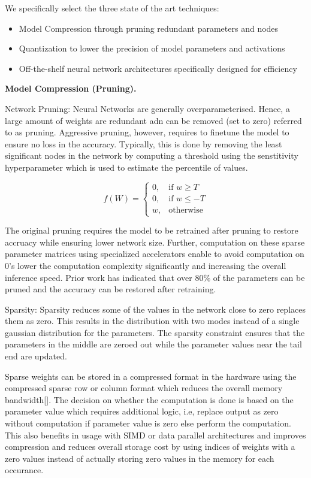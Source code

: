 We specifically select the three state of the art techniques:
\begin{itemize}
\item Model Compression through pruning redundant parameters and nodes
\item Quantization to lower the precision of model parameters and activations
\item Off-the-shelf neural network architectures specifically designed for efficiency
\end{itemize}

\noindent\textbf{Model Compression (Pruning).}

Network Pruning: Neural Networks are generally overparameterised. Hence, a large amount of weights are redundant adn can be removed (set to zero) referred to as pruning.
Aggressive pruning, however, requires to finetune the model to ensure no loss in the accuracy. Typically, this is done by removing the least significant nodes in the network by computing a threshold using the senstitivity hyperparameter which is used to estimate the percentile of values.

\[
    f(W)=
\begin{cases}
    0, & \text{if } w\geq T\\
    0, & \text{if } w\leq -T\\
    w,  & \text{otherwise}
\end{cases}
\]

The original pruning requires the model to be retrained after pruning to restore accruacy while ensuring lower network size.
Further, computation on these sparse parameter matrices using specialized accelerators enable to avoid computation on 0's lower the computation complexity significantly and increasing the overall inference speed.
Prior work has indicated that over 80\% of the parameters can be pruned and the accuracy can be restored after retraining.

Sparsity: Sparsity reduces some of the values in the network close to zero replaces them as zero. This results in the distribution with two modes instead of a single gaussian distribution for the parameters.
The sparsity constraint ensures that the parameters in the middle are zeroed out while the parameter values near the tail end are updated.

Sparse weights can be stored in a compressed format in the hardware using the compressed sparse row or column format which reduces the overall memory bandwidth[].
The decision on whether the computation is done is based on the parameter value which requires additional logic, i.e, replace output as zero without computation if parameter value is zero else perform the computation.
This also benefits in usage with SIMD or data parallel architectures and improves compression and reduces overall storage cost by using indices of weights with a zero values instead of actually storing zero values in the memory for each occurance.



